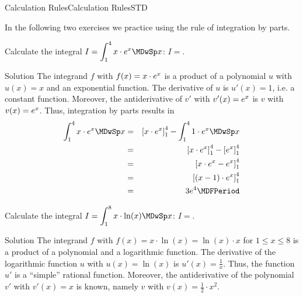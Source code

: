 \begin{MXContent}{Calculation Rules}{Calculation Rules}{STD}
\begin{MCOSHZusatz}
In the following two exercises we practice using the rule of integration by parts. 

\begin{MExercise}
Calculate the integral $\displaystyle I = \int_{1}^{4} x \cdot \MEU^{x} \MDwSp x$: 
$I = $. 

\begin{MHint}{Solution}
The integrand $f$ with $f(x) = x \cdot e^{x}$ is a product of a polynomial 
$u$ with $u(x) = x$ and an exponential function. The derivative of $u$ is $u'(x) = 1$, i.e. 
a constant function. Moreover, the antiderivative of $v'$ with $v'(x) = e^{x}$ is $v$ with $v(x) = e^{x}$. 
Thus, integration by parts results in
\begin{eqnarray*}
 \int_{1}^{4} x \cdot \MEU^{x} \MDwSp x %
& = & \left[ x \cdot \MEU^{x} \right]_{1}^{4} - \int_{1}^{4} 1 \cdot \MEU^{x} \MDwSp x \\
& = & \left[ x \cdot \MEU^{x} \right]_{1}^{4} - \left[ \MEU^{x} \right]_{1}^{4} \\
& = & \left[ x \cdot \MEU^{x} - \MEU^{x} \right]_{1}^{4} \\
& = & \left[ (x - 1) \cdot \MEU^{x} \right]_{1}^{4} \\
& = & 3 \MEU^{4} \MDFPeriod %
\end{eqnarray*}
\end{MHint}
\end{MExercise}

\begin{MExercise}
Calculate the integral $I = \displaystyle \int_{1}^{8} x \cdot \ln(x) \MDwSp x$: 
$I = $. 

\begin{MHint}{Solution}
The integrand $f$ with $f(x) = x \cdot \ln(x) = \ln(x) \cdot x$ for
$1 \leq x \leq 8$ is a product of a polynomial and a logarithmic function. The 
derivative of the logarithmic function $u$ with $u(x) = \ln(x)$ is $u'(x) = \frac{1}{x}$.
Thus, the function $u'$ is a ``simple'' rational function. Moreover, the antiderivative of 
the polynomial $v'$ with $v'(x) = x$ is known, namely $v$ with $v(x) = \frac{1}{2} \cdot x^2$. 


\end{MHint}
\end{MExercise}
\end{MCOSHZusatz}
\end{MXContent}

